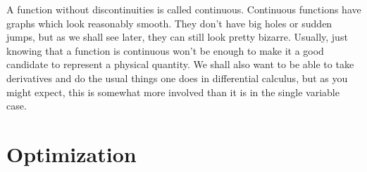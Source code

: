   A function without discontinuities is called continuous.
Continuous functions have graphs which look reasonably 
smooth.  They don't have big holes or sudden jumps,
 but as we shall see later, they can still look pretty
bizarre.   Usually, just knowing that a function is continuous
won't be enough to make it a good candidate to represent a
physical quantity.  We shall also want to be able to take
derivatives and do the usual things one does in differential
calculus, but as you might expect, this is somewhat more involved
than it is in the single variable case. 


\begin{exercises}
\end{exercises}

\section{Optimization}

\begin{exercises}
\end{exercises}

